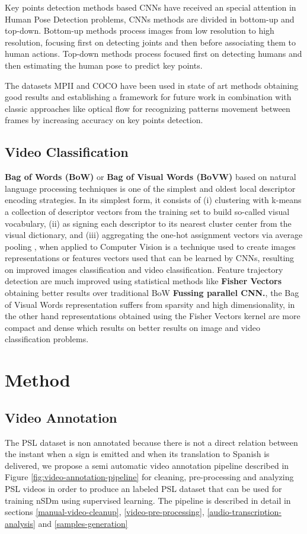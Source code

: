 \documentclass[twocolumn,conference]{article}
\begin{document}
Key points detection methods based CNNs have received an special attention in Human Pose Detection problems, CNNs methods are divided in bottom-up and top-down. Bottom-up methods process images from low resolution  to high resolution, focusing first on detecting joints and then before associating them to human actions. Top-down methods process focused first on detecting humans and then estimating the human pose to predict key points. 

The datasets MPII and COCO have been used in state of art methods obtaining good results\cite{XiaoWuWeiSimpleBaseline} and establishing a framework for future work in combination with classic approaches like optical flow for recognizing patterns movement between frames by increasing accuracy on key points detection.
\subsection{Video Classification}
\textbf{Bag of Words (BoW)} or \textbf{Bag of Visual Words (BoVW)} based on natural language processing techniques is one of the simplest and oldest local descriptor encoding strategies. In its simplest form, it consists of (i) clustering with k-means a collection of descriptor vectors from the training set to build so-called visual vocabulary, (ii) as signing each descriptor to its nearest cluster center from the visual dictionary, and (iii) aggregating the one-hot assignment vectors via average pooling \cite{wang2019hallucinating}, when applied to Computer Vision is a technique used to create images representations or features vectors used that can be learned by CNNs, resulting on improved images classification and video classification. 
Feature trajectory detection are much improved using statistical methods like \textbf{Fisher Vectors} obtaining better results over traditional BoW \textbf{Fussing parallel CNN.}, the Bag of Visual Words representation suffers from sparsity and high dimensionality, in the other hand representations obtained using the Fisher Vectors kernel are more compact and dense which results on better results on image and video classification problems.
\section{Method}\label{method}
\subsection{Video Annotation}\label{videoannot}
The PSL dataset is non annotated because there is not a direct relation between the instant when a sign is emitted and when its translation to Spanish is delivered, we propose a semi automatic video annotation pipeline described in Figure \ref{fig:video-annotation-pipeline} for cleaning, pre-processing and analyzing PSL videos in order to produce an labeled PSL dataset that can be used for training nSDm using supervised learning. The pipeline is described in detail in sections  \ref{manual-video-cleanup}, \ref{video-pre-processing}, \ref{audio-transcription-analysis} and \ref{samples-generation}
\end{document}
